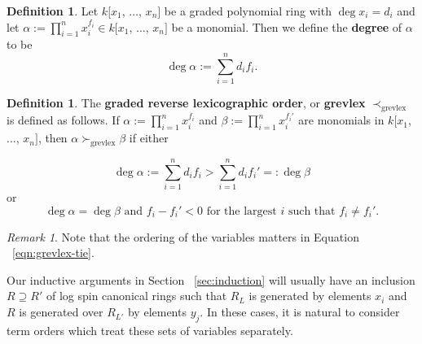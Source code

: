 \documentclass{amsart}
\theoremstyle{plain}
\theoremstyle{definition}
\newtheorem{defn}[thm]{Definition}
\theoremstyle{remark}
\newtheorem{rem}[thm]{Remark}
\numberwithin{equation}{section}
\newcommand{\halfcan}{L}
\begin{document}

\begin{defn}
\label{defn:monomial-degree}
Let $k[x_1$, $\ldots$, $x_n]$ be a graded polynomial
ring with $\deg x_i = d_i$ and let $\alpha := \prod_{i = 1}^{n} x_{i}^{f_i} \in
k[x_{1}$, $\ldots$, $x_{n}]$ be a monomial. Then
we define the {\bf degree} of $\alpha$ to be
\[
	\deg \alpha := \sum_{i = 1}^{n} d_i f_i.
\]
\end{defn}

\begin{defn}
\label{defn:grevlex}
The {\bf graded reverse lexicographic order}, or {\bf grevlex} $\prec_{\text{grevlex}}$ is defined as follows.
If $\alpha := \prod_{i = 1}^{n} x_{i}
^{f_i}$ and $\beta := \prod_{i = 1}^{n} x_{i}^{f_i'}$ are
monomials in $k[x_{1}$, $\ldots$, $x_{n}]$, then $\alpha
\succ_{\text{grevlex}} \beta$ if either

\begin{equation}
	\deg \alpha := \sum_{i = 1}^{n} d_i f_i  > \sum_{i = 1}^{n} d_i f_i' =: \deg \beta
\end{equation}
or
\begin{equation}
\label{eqn:grevlex-tie}
	\deg \alpha = \deg \beta \text{ and }	f_i - f_i' < 0 \text{ for
	the	largest } i \text{ such that } f_i \neq f_i'.
\end{equation}
\end{defn}

\begin{rem}
Note that the ordering of the variables matters in Equation
~\ref{eqn:grevlex-tie}.
\end{rem}

Our inductive arguments in Section ~\ref{sec:induction} will
usually have an inclusion $R \supseteq R'$ of log spin canonical
rings such that $R_\halfcan$ is generated by elements $x_{i}$ and $R$
is generated over $R_{\halfcan'}$ by elements $y_j$. In these cases, it is
natural to consider term orders which treat these sets of variables
separately.
\end{document}

